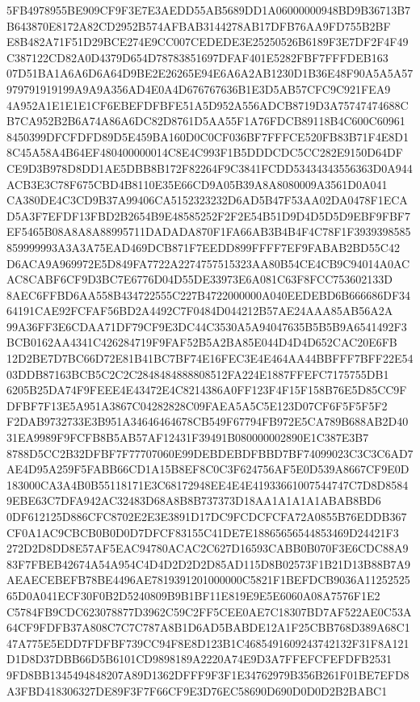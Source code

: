 \documentclass[UTF8,fontset=fandol,zihao=-4,a4paper]{ctexart}
\begin{document}
{{5FB4978955BE909CF9F3E7E3AEDD55AB5689DD1A06000000948BD9B36713B7B643870E8172A82CD2952B574AFBAB3144278AB17DFB76AA9FD755B2BF
E8B482A71F51D29BCE274E9CC007CEDEDE3E25250526B6189F3E7DF2F4F49C387122CD82A0D4379D654D78783851697DFAF401E5282FBF7FFFDEB163
07D51BA1A6A6D6A64D9BE2E26265E94E6A6A2AB1230D1B36E48F90A5A5A57979791919199A9A9A356AD4E0A4D676767636B1E3D5AB57CFC9C921FEA9
4A952A1E1E1E1CF6EBEFDFBFE51A5D952A556ADCB8719D3A75747474688CB7CA952B2B6A74A86A6DC82D8761D5AA55F1A76FDCB89118B4C600C60961
8450399DFCFDFD89D5E459BA160D0C0CF036BF7FFFCE520FB83B71F4E8D18C45A58A4B64EF480400000014C8E4C993F1B5DDDCDC5CC282E9150D64DF
CE9D3B978D8DD1AE5DBB8B172F82264F9C3841FCDD53434343556363D0A944ACB3E3C78F675CBD4B8110E35E66CD9A05B39A8A8080009A3561D0A041
CA380DE4C3CD9B37A99406CA5152323232D6AD5B47F53AA02DA0478F1ECAD5A3F7EFDF13FBD2B2654B9E48585252F2F2E54B51D9D4D5D5D9EBF9FBF7
EF5465B08A8A8A88995711DADADA870F1FA66AB3B4B4F4C78F1F3939398585859999993A3A3A75EAD469DCB871F7EEDD899FFFF7EF9FABAB2BD55C42
D6ACA9A969972E5D849FA7722A2274757515323AA80B54CE4CB9C94014A0ACAC8CABF6CF9D3BC7E6776D04D55DE33973E6A081C63F8FCC753602133D
8AEC6FFBD6AA558B434722555C227B4722000000A040EEDEBD6B666686DF3464191CAE92FCFAF56BD2A4492C7F0484D044212B57AE24AAA85AB56A2A
99A36FF3E6CDAA71DF79CF9E3DC44C3530A5A94047635B5B5B9A6541492F3BCB0162AA4341C426284719F9FAF52B5A2BA85E044D4D4D652CAC20E6FB
12D2BE7D7BC66D72E81B41BC7BF74E16FEC3E4E464AA44BBFFF7BFF22E5403DDB87163BCB5C2C2C2848484888808512FA224E1887FFEFC7175755DB1
6205B25DA74F9FEEE4E43472E4C8214386A0FF123F4F15F158B76E5D85CC9FDFBF7F13E5A951A3867C04282828C09FAEA5A5C5E123D07CF6F5F5F5F2
F2DAB9732733E3B951A34646464678CB549F67794FB972E5CA789B688AB2D4031EA9989F9FCFB8B5AB57AF12431F39491B080000002890E1C387E3B7
8788D5CC2B32DFBF7F77707060E99DEBDEBDFBBD7BF74099023C3C3C6AD7AE4D95A259F5FABB66CD1A15B8EF8C0C3F624756AF5E0D539A8667CF9E0D
183000CA3A4B0B55118171E3C68172948EE4E4E41933661007544747C7D8D85849EBE63C7DFA942AC32483D68A8B8B737373D18AA1A1A1A1ABAB8BD6
0DF612125D886CFC8702E2E3E3891D17DC9FCDCFCFA72A0855B76EDDB367CF0A1AC9CBCB0B0D0D7DFCF83155C41DE7E18865656544853469D24421F3
272D2D8DD8E57AF5EAC94780ACAC2C627D16593CABB0B070F3E6CDC88A983F7FBEB42674A54A954C4D4D2D2D2D85AD115D8B02573F1B21D13B88B7A9
AEAECEBEFB78BE4496AE7819391201000000C5821F1BEFDCB9036A1125252565D0A041ECF30F0B2D5240809B9B1BF11E819E9E5E6060A08A7576F1E2
C5784FB9CDC623078877D3962C59C2FF5CEE0AE7C18307BD7AF522AE0C53A64CF9FDFB37A808C7C7C787A8B1D6AD5BABDE12A1F25CBB768D389A68C1
47A775E5EDD7FDFBF739CC94F8E8D123B1C4685491609243742132F31F8A121D1D8D37DBB66D5B6101CD9898189A2220A74E9D3A7FFEFCFEFDFB2531
9FD8BB1345494848207A89D1362DFFF9F3F1E34762979B356B261F01BE7EFD8A3FBD418306327DE89F3F7F66CF9E3D76EC58690D690D0D0D2B2BABC1
}}
\end{document}
